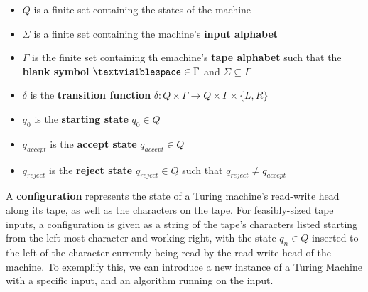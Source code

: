 \documentclass{article}
\begin{document}
\begin{itemize}
	\item $Q$ is a finite set containing the states of the machine
	\item $\Sigma$ is a finite set containing the machine's \textbf{input alphabet}
	\item $\Gamma$ is the finite set containing th emachine's \textbf{tape alphabet} such that the \textbf{blank symbol} $\textvisiblespace \in \Gamma$ and $\Sigma \subseteq \Gamma$
	\item $\delta$ is the \textbf{transition function} $\delta: Q \times \Gamma \to Q \times \Gamma \times \{L, R\}$
	\item $q_{0}$ is the \textbf{starting state} $q_{0} \in Q$
	\item $q_{accept}$ is the \textbf{accept state} $q_{accept} \in Q$
	\item $q_{reject}$ is the \textbf{reject state} $q_{reject} \in Q$ such that $q_{reject} \neq q_{accept}$
\end{itemize}
\noindent A \textbf{configuration} represents the state of a Turing machine's read-write head along its tape, as well as the characters on the tape.  For feasibly-sized tape inputs, a configuration is given as a string of the tape's characters listed starting from the left-most character and working right, with the state $q_{n} \in Q$ inserted to the left of the character currently being read by the read-write head of the machine.  To exemplify this, we can introduce a new instance of a Turing Machine with a specific input, and an algorithm running on the input.
\end{document}
